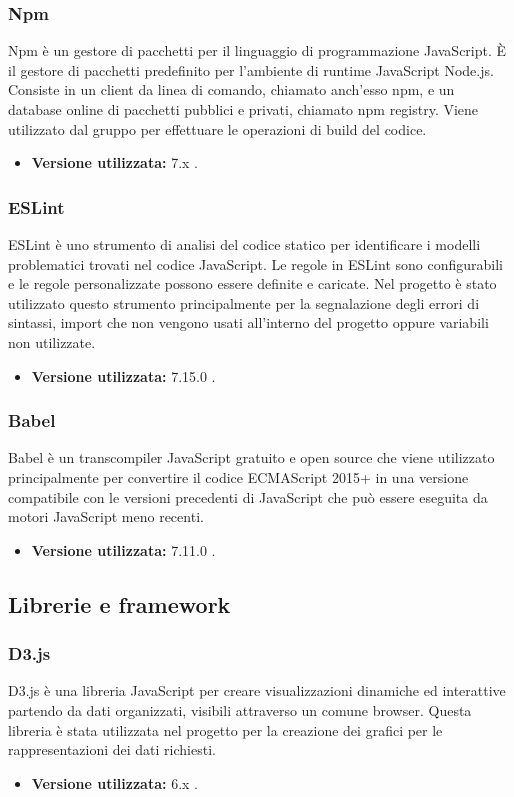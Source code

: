 \subsubsection{Npm}
Npm è un gestore di pacchetti per il linguaggio di programmazione JavaScript. È il gestore di pacchetti predefinito per l'ambiente di runtime JavaScript Node.js. Consiste in un client da linea di comando, chiamato anch'esso npm, e un database online di pacchetti pubblici e privati, chiamato npm registry.
Viene utilizzato dal gruppo per effettuare le operazioni di build del codice.
\begin{itemize}
\item \textbf{Versione utilizzata:} 7.x .
\end{itemize}
\subsubsection{ESLint}
ESLint è uno strumento di analisi del codice statico per identificare i modelli problematici trovati nel codice JavaScript. Le regole in ESLint sono configurabili e le regole personalizzate possono essere definite e caricate.
Nel progetto \NomeProgetto{} è stato utilizzato questo strumento principalmente per la segnalazione degli errori di sintassi, import che non vengono usati all'interno del progetto oppure variabili non utilizzate.
\begin{itemize}
\item \textbf{Versione utilizzata:} 7.15.0 .
\end{itemize}
\subsubsection{Babel}
Babel è un transcompiler JavaScript gratuito e open source che viene utilizzato principalmente per convertire il codice ECMAScript 2015+ in una versione compatibile con le versioni precedenti di JavaScript che può essere eseguita da motori JavaScript meno recenti.
\begin{itemize}
\item \textbf{Versione utilizzata:} 7.11.0 .
\end{itemize}

\subsection{Librerie e framework}
\subsubsection{D3.js}
D3.js è una libreria JavaScript per creare visualizzazioni dinamiche ed interattive partendo da dati organizzati, visibili attraverso un comune browser.
Questa libreria è stata utilizzata nel progetto \NomeProgetto{} per la creazione dei grafici per le rappresentazioni dei dati richiesti.
\begin{itemize}
\item \textbf{Versione utilizzata:} 6.x .
\end{itemize}

